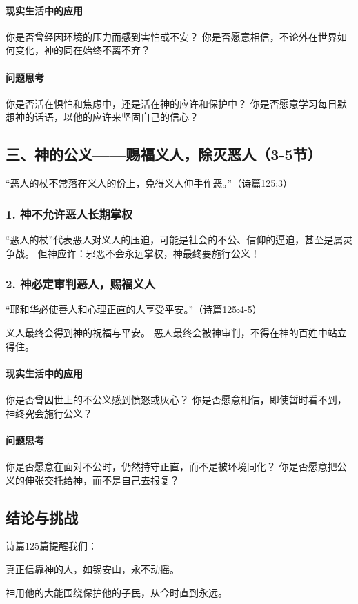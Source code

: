 \documentclass[a4paper, 12pt]{article}
\begin{document}
\paragraph*{现实生活中的应用}
你是否曾经因环境的压力而感到害怕或不安？
你是否愿意相信，不论外在世界如何变化，神的同在始终不离不弃？
\paragraph*{问题思考}

你是否活在惧怕和焦虑中，还是活在神的应许和保护中？
你是否愿意学习每日默想神的话语，以他的应许来坚固自己的信心？
\subsection*{三、神的公义——赐福义人，除灭恶人（3-5节）}
“恶人的杖不常落在义人的份上，免得义人伸手作恶。”（诗篇125:3）

\subsubsection*{1. 神不允许恶人长期掌权}
“恶人的杖”代表恶人对义人的压迫，可能是社会的不公、信仰的逼迫，甚至是属灵争战。
但神应许：邪恶不会永远掌权，神最终要施行公义！
\subsubsection*{2. 神必定审判恶人，赐福义人}
“耶和华必使善人和心理正直的人享受平安。”（诗篇125:4-5）

义人最终会得到神的祝福与平安。
恶人最终会被神审判，不得在神的百姓中站立得住。
\paragraph*{现实生活中的应用}
你是否曾因世上的不公义感到愤怒或灰心？
你是否愿意相信，即使暂时看不到，神终究会施行公义？
\paragraph*{问题思考}

你是否愿意在面对不公时，仍然持守正直，而不是被环境同化？
你是否愿意把公义的伸张交托给神，而不是自己去报复？
\subsection*{结论与挑战}
诗篇125篇提醒我们：

真正信靠神的人，如锡安山，永不动摇。

神用他的大能围绕保护他的子民，从今时直到永远。
\end{document}
